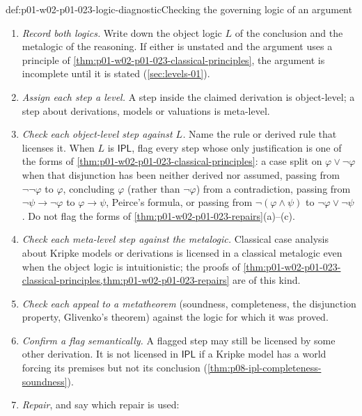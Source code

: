 \begin{hbmethod}{def:p01-w02-p01-023-logic-diagnostic}{Checking the governing logic of an argument}
\begin{enumerate}
  \item \emph{Record both logics.} Write down the object logic \(L\) of the
        conclusion and the metalogic of the reasoning. If either is unstated
        and the argument uses a principle of
        \cref{thm:p01-w02-p01-023-classical-principles}, the argument is
        incomplete until it is stated (\cref{sec:levels-01}).
  \item \emph{Assign each step a level.} A step inside the claimed
        derivation is object-level; a step about derivations, models or
        valuations is meta-level.
  \item \emph{Check each object-level step against \(L\).} Name the rule or
        derived rule that licenses it. When \(L\) is \(\mathsf{IPL}\), flag
        every step whose only justification is one of the forms of
        \cref{thm:p01-w02-p01-023-classical-principles}: a case split on
        \(\varphi\lor\neg\varphi\) when that disjunction has been neither
        derived nor assumed,
        passing from \(\neg\neg\varphi\) to \(\varphi\), concluding
        \(\varphi\) (rather than \(\neg\varphi\)) from a contradiction,
        passing from \(\neg\psi\to\neg\varphi\) to \(\varphi\to\psi\),
        Peirce's formula, or passing from \(\neg(\varphi\land\psi)\) to
        \(\neg\varphi\lor\neg\psi\). Do not flag the forms of
        \cref{thm:p01-w02-p01-023-repairs}(a)--(c).
  \item \emph{Check each meta-level step against the metalogic.} Classical
        case analysis about Kripke models or derivations is licensed in a
        classical metalogic even when the object logic is intuitionistic;
        the proofs of
        \cref{thm:p01-w02-p01-023-classical-principles,thm:p01-w02-p01-023-repairs}
        are of this kind.
  \item \emph{Check each appeal to a metatheorem} (soundness, completeness,
        the disjunction property, Glivenko's theorem) against the logic for
        which it was proved.
  \item \emph{Confirm a flag semantically.} A flagged step may still be
        licensed by some other derivation. It is not licensed in
        \(\mathsf{IPL}\) if a Kripke model has a world forcing its premises
        but not its conclusion (\cref{thm:p08-ipl-completeness-soundness}).
  \item \emph{Repair}, and say which repair is used:

\end{enumerate}
\end{hbmethod}
